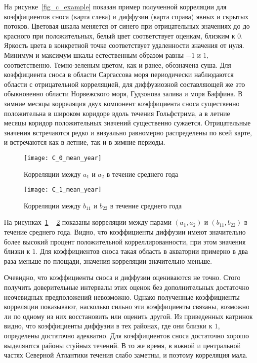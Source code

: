 На рисунке~\ref{fig_c_example} показан пример полученной корреляции для коэффициентов сноса (карта слева) и диффузии (карта справа) явных и скрытых потоков. Цветовая шкала меняется от синего при отрицательных значениях до до красного при положительных, белый цвет соответствует оценкам, близким к $0$. Яркость цвета в конкретной точке соответствует удаленности значения от нуля. Минимум и максимум шкалы естественным образом равны $-1$ и $1$, соответственно. Темно-зеленым цветом, как и ранее, обозначена суша. Для коэффициента сноса в области Саргассова моря периодически наблюдаются области с отрицательной корреляцией, для диффузиозной составляющей же это обыкновенно области Норвежского моря, Гудзонова залива и моря Баффина. В зимние месяцы корреляция двух компонент коэффициента сноса существенно положительна в широком коридоре вдоль течения Гольфстрима, а в летние месяцы коридор положительных значений существенно сужается. Отрицательные значения встречаются редко и визуально равномерно распределены по всей карте, и встречаются как в летние, так и в зимние периоды.

\begin{figure}[h!]
	\centering
	\texttt{[image: C\_0\_mean\_year]}
	\caption{Корреляции между $a_1$ и $a_2$ в течение среднего года}
	\label{fig_c0}
\end{figure}

\begin{figure}[h!]
	\centering
	\texttt{[image: C\_1\_mean\_year]}
	\caption{Корреляции между $b_{11}$ и $b_{22}$ в течение среднего года}
	\label{fig_c1}
\end{figure}

На рисунках~\ref{fig_c0} -~\ref{fig_c1} показаны корреляции между парами $(a_1, a_2)$ и $(b_{11}, b_{22})$ в течение среднего года. Видно, что коэффициенты диффузии имеют значительно более высокий процент положительной корреллированности, при этом значения близки к $1$. Для коэффициентов сноса такая область в акватории примерно в два раза меньше по площади, значения корреляции значительно меньше. 

Очевидно, что коэффициенты сноса и диффузии оцениваются не точно. Стого получить доверительные интервалы этих оценок без дополнительных достаточно неочевидных предположений невозможно. Однако полученные коэффициенты корреляции показывают, насколько сильно эти коэффициенты связаны, возможно ли по одному из них восстановить или оценить другой. Из приведенных катринок видно, что коэффициенты диффузии в тех районах, где они близки к $1$, определены достаточно адекватно. Для коэффициентов сноса достаточно хорошо выделяются районы стуйных течений. В то же время, в южной и центральной частях Северной Атлантики течения слабо заметны, и поэтому корреляция мала.

